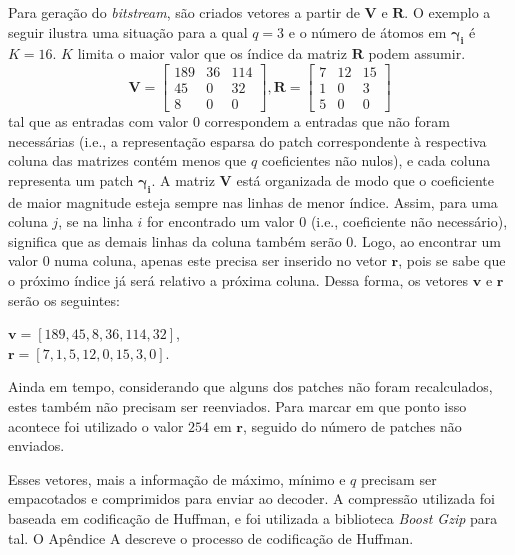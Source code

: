 \documentclass[cic,tc]{iiufrgs}
\renewcommand{\vec}[1]{\bm{#1}}
\newcommand{\mat}[1]{\bm{#1}}
\begin{document}
Para geração do \textit{bitstream}, são criados vetores a partir de $\mat{V}$ e $\mat{R}$.
O exemplo a seguir ilustra uma situação para a qual $q = 3$ e o número de átomos em 
$\vec{\gamma_i}$ é $K = 16$. 
$K$ limita o maior valor que os índice da matriz $\mat{R}$ podem assumir. 
\begin{equation*}
    \mat{V} = 
    \begin{bmatrix}
        189 & 36 & 114 \\
        45  & 0 & 32  \\
        8   & 0 & 0
    \end{bmatrix},
    \mat{R} = 
    \begin{bmatrix}
        7 & 12 & 15 \\
        1  & 0 & 3  \\
        5   & 0 & 0
    \end{bmatrix}
\end{equation*}
tal que as entradas com valor $0$ correspondem a entradas que não foram necessárias 
(i.e., a representação esparsa do patch correspondente à respectiva coluna das matrizes 
contém menos que $q$ coeficientes não nulos),
e cada coluna representa um patch $\vec{\gamma_i}$.
A matriz $\mat{V}$ está organizada de modo que o coeficiente de maior magnitude
esteja sempre nas linhas de menor índice. 
Assim, para uma coluna $j$, se na linha $i$ for encontrado um valor $0$ (i.e., coeficiente não necessário),
significa que as demais linhas da coluna também serão $0$.
Logo, ao encontrar um valor $0$ numa coluna, apenas este precisa ser inserido no vetor $\vec{r}$, 
pois se sabe que o próximo índice já será relativo a próxima coluna.  
Dessa forma, os vetores $\vec{v}$ e $\vec{r}$ serão os seguintes: 
\begin{center}
    $\vec{v} = \left[ 189, 45, 8, 36, 114, 32 \right]$, \\
    $\vec{r} = \left[ 7,1,5,12,0,15,3,0 \right]$.
\end{center}

Ainda em tempo, considerando que alguns dos patches não foram recalculados, estes 
também não precisam ser reenviados. 
Para marcar em que ponto isso acontece foi utilizado o valor $254$ em $\vec{r}$, 
seguido do número de patches não enviados.

Esses vetores, mais a informação de máximo, mínimo e $q$ precisam ser empacotados 
e comprimidos para enviar ao decoder.
A compressão utilizada foi baseada em codificação de Huffman, e foi utilizada 
a biblioteca \textit{Boost Gzip} \cite{Boost} para tal. 
O Apêndice A descreve o processo de codificação de Huffman.
\end{document}
